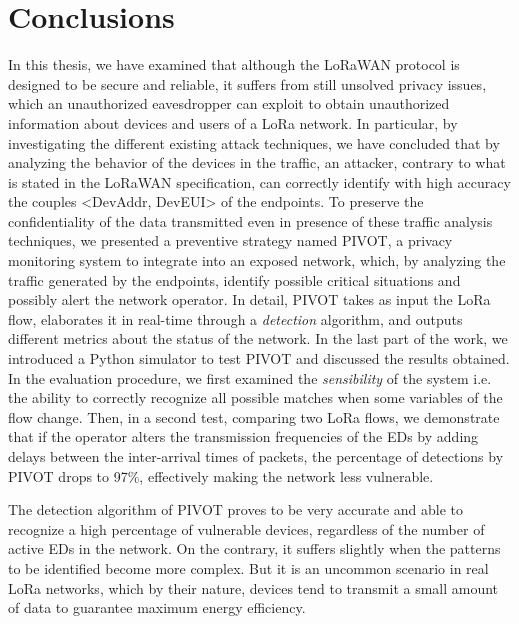 \chapter{Conclusions}
\label{conclusions}
In this thesis, we have examined that although the LoRaWAN protocol is designed to be secure and reliable, it suffers from still unsolved privacy issues, which an unauthorized eavesdropper can exploit to obtain unauthorized information about devices and users of a LoRa network. In particular, by investigating the different existing attack techniques, we have concluded that by analyzing the behavior of the devices in the traffic, an attacker, contrary to what is stated in the LoRaWAN specification, can correctly identify with high accuracy the couples <DevAddr, DevEUI> of the endpoints. To preserve the confidentiality of the data transmitted even in presence of these traffic analysis techniques, we presented a preventive strategy named PIVOT, a privacy monitoring system to integrate into an exposed network, which, by analyzing the traffic generated by the endpoints, identify possible critical situations and possibly alert the network operator. In detail, PIVOT takes as input the LoRa flow, elaborates it in real-time through a \textit{detection} algorithm, and outputs different metrics about the status of the network. In the last part of the work, we introduced a Python simulator to test PIVOT and discussed the results obtained. In the evaluation procedure, we first examined the \textit{sensibility} of the system i.e. the ability to correctly recognize all possible matches when some variables of the flow change. Then, in a second test, comparing two LoRa flows, we demonstrate that if the operator alters the transmission frequencies of the EDs by adding delays between the inter-arrival times of packets, the percentage of detections by PIVOT drops to 97\%, effectively making the network less vulnerable.

\vspace{3mm}

The detection algorithm of PIVOT proves to be very accurate and able to recognize a high percentage of vulnerable devices, regardless of the number of active EDs in the network. On the contrary, it suffers slightly when the patterns to be identified become more complex. But it is an uncommon scenario in real LoRa networks, which by their nature, devices tend to transmit a small amount of data to guarantee maximum energy efficiency.

\vspace{3mm}

